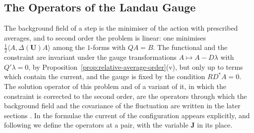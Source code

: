 \documentclass[11pt]{preprint}
\numberwithin{equation}{section}
\begin{document}
\subsection{The Operators of the Landau Gauge}\label{sec:landau-operators}

The background field of a step is the minimiser of the action with prescribed averages, and to second order the problem is linear: one minimises $\frac{1}{2}\langle A, \Delta(\mathbf U)A\rangle$ among the $1$-forms with $QA = B$. The functional and the constraint are invariant under the gauge transformations $A \mapsto A - D\lambda$ with $Q'\lambda = 0$, by Proposition~\ref{prop:relative-average-order}(v), but only up to terms which contain the current, and the gauge is fixed by the condition $RD^*A = 0$. The solution operator of this problem and of a variant of it, in which the constraint is corrected to the second order, are the operators through which the background field and the covariance of the fluctuation are written in the later sections \cite[Sect.~D]{BalabanPBG}. In the formulae the current of the configuration appears explicitly, and following \cite[p.~261]{BalabanRG1} we define the operators at a pair, with the variable $\mathbf J$ in its place.
\end{document}
